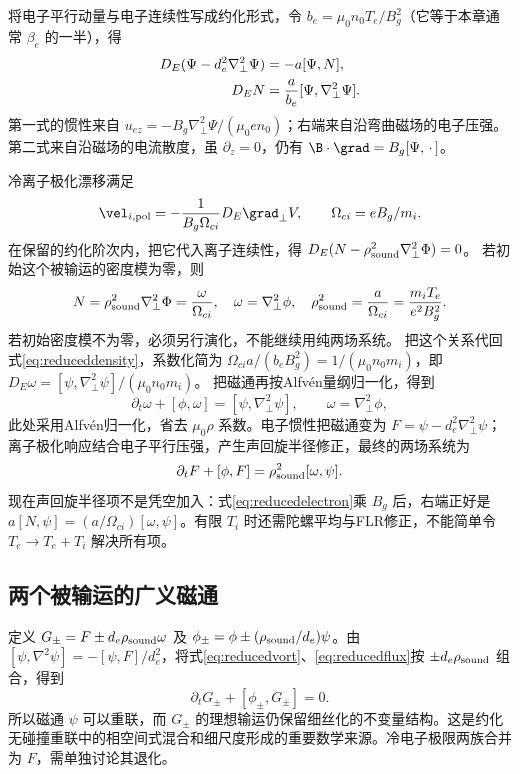 将电子平行动量与电子连续性写成约化形式，令 $b_e=\mu_0n_0T_e/B_g^2$（它等于本章通常 $\beta_e$ 的一半），得
\begin{align}
D_E(\Psi-d_e^2\nabla_\perp^2\Psi)&=-a[\Psi,N],\label{eq:reducedelectron}\\
D_EN&={a\over b_e}[\Psi,\nabla_\perp^2\Psi].\label{eq:reduceddensity}
\end{align}
第一式的惯性来自 $u_{ez}=-B_g\nabla_\perp^2\Psi/(\mu_0en_0)$；右端来自沿弯曲磁场的电子压强。第二式来自沿磁场的电流散度，虽 $\partial_z=0$，仍有 $\B\cdot\grad=B_g[\Psi,\,\cdot\,]$。

冷离子极化漂移满足
\begin{equation}
\vel_{i,\rm pol}=-{1\over B_g\Omega_{ci}}D_E\grad_\perp V,
\qquad\Omega_{ci}=eB_g/m_i.
\end{equation}
在保留的约化阶次内，把它代入离子连续性，得
$D_E(N-\rho_{\rm sound}^2\nabla_\perp^2\Phi)=0$。
若初始这个被输运的密度模为零，则
\begin{equation}
N=\rho_{\rm sound}^2\nabla_\perp^2\Phi={\omega\over\Omega_{ci}},
\quad\omega=\nabla_\perp^2\phi,\quad
\rho_{\rm sound}^2={a\over\Omega_{ci}}={m_iT_e\over e^2B_g^2}.
\end{equation}
若初始密度模不为零，必须另行演化，不能继续用纯两场系统。
把这个关系代回式\eqref{eq:reduceddensity}，系数化简为
$\Omega_{ci}a/(b_eB_g^2)=1/(\mu_0n_0m_i)$，即
$D_E\omega=[\psi,\nabla_\perp^2\psi]/(\mu_0n_0m_i)$。
把磁通再按Alfvén量纲归一化，得到
\begin{equation}\partial_t\omega+[\phi,\omega]=[\psi,\nabla_\perp^2\psi],\qquad\omega=\nabla_\perp^2\phi,\label{eq:reducedvort}\end{equation}
此处采用Alfvén归一化，省去 $\mu_0\rho$ 系数。电子惯性把磁通变为 $F=\psi-d_e^2\nabla_\perp^2\psi$；离子极化响应结合电子平行压强，产生声回旋半径修正，最终的两场系统为
\begin{equation}\partial_tF+[\phi,F]=\rho_{\rm sound}^2[\omega,\psi].\label{eq:reducedflux}\end{equation}
现在声回旋半径项不是凭空加入：式\eqref{eq:reducedelectron}乘 $B_g$ 后，右端正好是 $a[N,\psi]=(a/\Omega_{ci})[\omega,\psi]$。有限 $T_i$ 时还需陀螺平均与FLR修正，不能简单令 $T_e\to T_e+T_i$ 解决所有项。

\subsection{两个被输运的广义磁通}
定义 $G_\pm=F\pm d_e\rho_{\rm sound}\omega$ 及
$\phi_\pm=\phi\pm(\rho_{\rm sound}/d_e)\psi$。由
$[\psi,\nabla^2\psi]=-[\psi,F]/d_e^2$，将式\eqref{eq:reducedvort}、\eqref{eq:reducedflux}按 $\pm d_e\rho_{\rm sound}$ 组合，得到
\begin{equation}\partial_tG_\pm+[\phi_\pm,G_\pm]=0.
\end{equation}
所以磁通 $\psi$ 可以重联，而 $G_\pm$ 的理想输运仍保留细丝化的不变量结构。这是约化无碰撞重联中的相空间式混合和细尺度形成的重要数学来源。冷电子极限两族合并为 $F$，需单独讨论其退化。\citep{Ottaviani1993,Schep1994,L049}

